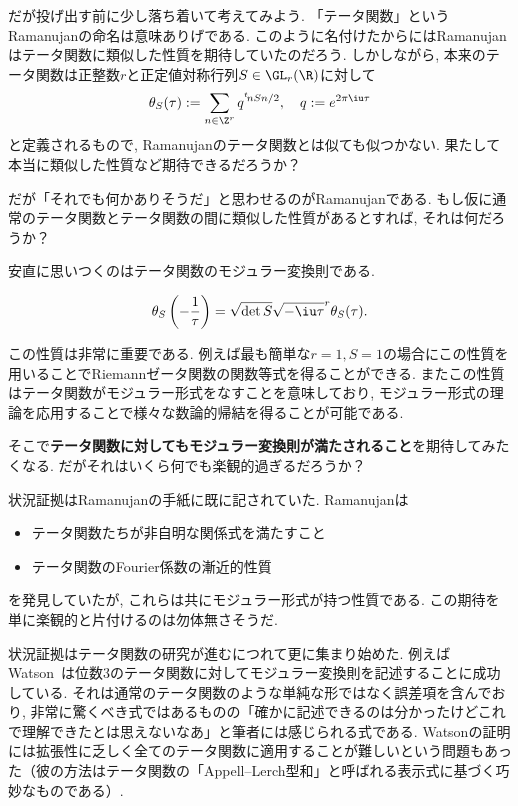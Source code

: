 \documentclass[11pt,b5paper,oneside,lualatex]{ltjsarticle} %
\numberwithin{equation}{section} %
\begin{document}
だが投げ出す前に少し落ち着いて考えてみよう. 
「テータ関数」というRamanujanの命名は意味ありげである. 
このように名付けたからにはRamanujanはテータ関数に類似した性質を期待していたのだろう. 
しかしながら, 本来のテータ関数は正整数$ r $と正定値対称行列$ S \in \GL_r(\R) $に対して
\[
\theta_S (\tau) :=
\sum_{n \in \Z^r} q^{{}^t\!n S n/2}, \quad
q := e^{2\pi\iu\tau}
\]
と定義されるもので, Ramanujanのテータ関数とは似ても似つかない. 
果たして本当に類似した性質など期待できるだろうか？

だが「それでも何かありそうだ」と思わせるのがRamanujanである. 
もし仮に通常のテータ関数とテータ関数の間に類似した性質があるとすれば, それは何だろうか？

安直に思いつくのはテータ関数のモジュラー変換則である. 

\begin{prop}
	\label{prop:theta_modular_trans}
	\[
	\theta_S \left( -\frac{1}{\tau} \right) =
	\sqrt{\det S} \sqrt{-\iu \tau}^r \theta_S (\tau).
	\]
\end{prop}

この性質は非常に重要である. 
例えば最も簡単な$ r = 1, S = 1 $の場合にこの性質を用いることでRiemannゼータ関数の関数等式を得ることができる. 
またこの性質はテータ関数がモジュラー形式をなすことを意味しており, モジュラー形式の理論を応用することで様々な数論的帰結を得ることが可能である. 

そこで\textbf{テータ関数に対してもモジュラー変換則が満たされること}を期待してみたくなる. 
だがそれはいくら何でも楽観的過ぎるだろうか？

状況証拠はRamanujanの手紙に既に記されていた. 
Ramanujanは
\begin{itemize}
	\item {}テータ関数たちが非自明な関係式を満たすこと
	\item {}テータ関数のFourier係数の漸近的性質
\end{itemize}
を発見していたが, これらは共にモジュラー形式が持つ性質である. 
この期待を単に楽観的と片付けるのは勿体無さそうだ. 

状況証拠はテータ関数の研究が進むにつれて更に集まり始めた. 
例えばWatson~\cite[pp. 78]{Watson}は位数$ 3 $のテータ関数に対してモジュラー変換則を記述することに成功している. 
それは通常のテータ関数のような単純な形ではなく誤差項を含んでおり, 非常に驚くべき式ではあるものの「確かに記述できるのは分かったけどこれで理解できたとは思えないなあ」と筆者には感じられる式である. 
Watsonの証明には拡張性に乏しく全てのテータ関数に適用することが難しいという問題もあった（彼の方法はテータ関数の「Appell--Lerch型和」と呼ばれる表示式に基づく巧妙なものである）. 
\end{document}
